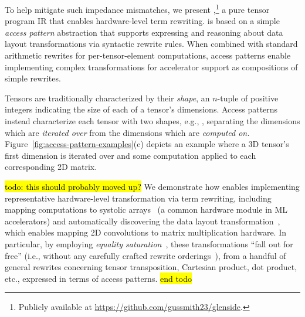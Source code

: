 To help mitigate such impedance mismatches,
  we present \textit{\g},\footnote{Publicly available at \url{https://github.com/gussmith23/glenside}.}
  a pure tensor program IR
  that enables hardware-level term rewriting.
\g is based on a simple
  \textit{access pattern} abstraction that
  supports expressing and reasoning about
  data layout transformations via
  syntactic rewrite rules.
When combined with standard arithmetic rewrites
  for per-tensor-element computations,
  access patterns enable implementing complex
  transformations for accelerator support as
  compositions of simple rewrites.

Tensors are traditionally characterized
  by their \textit{shape},
  an $n$-tuple 
  of positive integers
  indicating the size of each
  of a tensor's dimensions.
Access patterns instead characterize
  each tensor with two shapes, e.g.,
  , separating
  the dimensions which are \textit{iterated over} from
  the dimensions which are \textit{computed on.}
Figure~\ref{fig:access-pattern-examples}(c)
  depicts an example where a 3D tensor's
  first dimension is iterated over and
  some computation applied to each
  corresponding 2D matrix.

\hl{todo: this should probably moved up?}
We demonstrate how \g
  enables implementing representative
  hardware-level transformation via term rewriting,
  including mapping computations
  to systolic arrays~\cite{jouppi2017tpu}
  (a common hardware module in ML accelerators)
  and automatically discovering the
   data layout transformation~\cite{im2col},
  which enables mapping 2D convolutions
  to matrix multiplication hardware.
In particular,
  by employing \textit{equality saturation}~\cite{willsey2021egg},
  these transformations ``fall out for free''
  (i.e., without any carefully crafted
  rewrite orderings~\cite{phase-ordering}),
  from a handful of general rewrites concerning tensor
  transposition, Cartesian product, dot product, etc.,
  expressed in terms of access patterns.
\hl{end todo}

